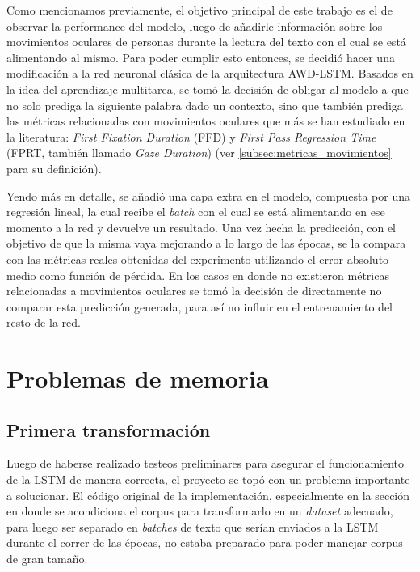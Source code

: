 Como mencionamos previamente, el objetivo principal de este trabajo es el de observar la performance del modelo, luego de añadirle información sobre los movimientos oculares de personas durante la lectura del texto con el cual se está alimentando al mismo. Para poder cumplir esto entonces, se decidió hacer una modificación a la red neuronal clásica de la arquitectura AWD-LSTM. Basados en la idea del aprendizaje multitarea, se tomó la decisión de obligar al modelo a que no solo prediga la siguiente palabra dado un contexto, sino que también prediga las métricas relacionadas con movimientos oculares que más se han estudiado en la literatura: \textit{First Fixation Duration} (FFD) y \textit{First Pass Regression Time} (FPRT, también llamado \textit{Gaze Duration}) (ver \ref{subsec:metricas_movimientos} para su definición).

Yendo más en detalle, se añadió una capa extra en el modelo, compuesta por una regresión lineal, la cual recibe el \textit{batch} con el cual se está alimentando en ese momento a la red y devuelve un resultado. Una vez hecha la predicción, con el objetivo de que la misma vaya mejorando a lo largo de las épocas, se la compara con las métricas reales obtenidas del experimento utilizando el error absoluto medio como función de pérdida. En los casos en donde no existieron métricas relacionadas a movimientos oculares se tomó la decisión de directamente no comparar esta predicción generada, para así no influir en el entrenamiento del resto de la red.

\section{Problemas de memoria}

\subsection{Primera transformación}

Luego de haberse realizado testeos preliminares para asegurar el funcionamiento de la LSTM de manera correcta, el proyecto se topó con un problema importante a solucionar. El código original de la implementación, especialmente en la sección en donde se acondiciona el corpus para transformarlo en un \textit{dataset} adecuado, para luego ser separado en \textit{batches} de texto que serían enviados a la LSTM durante el correr de las épocas, no estaba preparado para poder manejar corpus de gran tamaño. 

